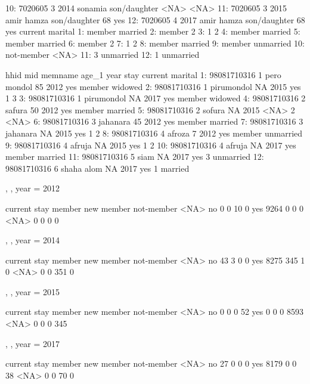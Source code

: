 \begin{Schunk}
\begin{Soutput}
10: 7020605   3 2014     sonamia son/daughter                 <NA> <NA>
11: 7020605   3 2015  amir hamza son/daughter                   68  yes
12: 7020605   4 2017  amir hamza son/daughter                   68  yes
       current   marital
 1:     member   married
 2:     member         2
 3:          1         2
 4:     member   married
 5:     member   married
 6:     member         2
 7:          1         2
 8:     member   married
 9:     member unmarried
10: not-member      <NA>
11:          3 unmarried
12:          1 unmarried
\end{Soutput}
\begin{Soutput}
           hhid mid     memname age_1 year stay current   marital
 1: 98081710316   1 pero mondol    85 2012  yes  member   widowed
 2: 98081710316   1  pirumondol    NA 2015  yes       1         3
 3: 98081710316   1  pirumondol    NA 2017  yes  member   widowed
 4: 98081710316   2      safura    50 2012  yes  member   married
 5: 98081710316   2      sofura    NA 2015 <NA>       2      <NA>
 6: 98081710316   3    jahanara    45 2012  yes  member   married
 7: 98081710316   3    jahanara    NA 2015  yes       1         2
 8: 98081710316   4      afroza     7 2012  yes  member unmarried
 9: 98081710316   4      afruja    NA 2015  yes       1         2
10: 98081710316   4      afruja    NA 2017  yes  member   married
11: 98081710316   5        siam    NA 2017  yes       3 unmarried
12: 98081710316   6  shaha alom    NA 2017  yes       1   married
\end{Soutput}
\begin{Soutput}
, , year = 2012

      current
stay   member new member not-member <NA>
  no        0          0         10    0
  yes    9264          0          0    0
  <NA>      0          0          0    0

, , year = 2014

      current
stay   member new member not-member <NA>
  no       43          3          0    0
  yes    8275        345          1    0
  <NA>      0          0        351    0

, , year = 2015

      current
stay   member new member not-member <NA>
  no        0          0          0   52
  yes       0          0          0 8593
  <NA>      0          0          0  345

, , year = 2017

      current
stay   member new member not-member <NA>
  no       27          0          0    0
  yes    8179          0          0   38
  <NA>      0          0         70    0
\end{Soutput}
\end{Schunk}
